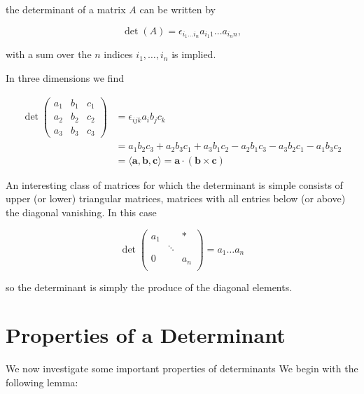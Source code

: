 \documentclass[a4paper,12pt]{report}
\begin{document}
the determinant of a matrix \(A\) can be written by

\begin{equation}
    \det(A) = \epsilon_{i_1 \ldots  i_n} a_{i_1 1} \ldots  a_{i_n n},
\end{equation}
    
with a sum over the \( n \) indices \( i_1, \ldots, i_n \) is implied.

In three dimensions we find 

\begin{equation}
    \begin{aligned}
        \det \begin{pmatrix} 
        a_1 & b_1 & c_1 \\ 
        a_2 & b_2 & c_2 \\ 
        a_3 & b_3 & c_3 
        \end{pmatrix} 
        &= \epsilon_{ijk} a_i b_j c_k \\ 
        &= a_1 b_2 c_3 + a_2 b_3 c_1 + a_3 b_1 c_2 - a_2 b_1 c_3 - a_3 b_2 c_1 - a_1 b_3 c_2 \\
        &= \langle \mathbf{a}, \mathbf{b}, \mathbf{c} \rangle = \mathbf{a} \cdot (\mathbf{b} \times \mathbf{c})
    \end{aligned}
\end{equation}

An interesting class of matrices for which the determinant is simple consists of upper (or lower) triangular matrices, \ie matrices with all entries below (or above) the diagonal vanishing. In this case

\begin{equation}
    \det \begin{pmatrix}
        a_1  &  & *  \\
         & \ddots  &   \\
        0 &  & a_{n}   \\
    \end{pmatrix} = a_1 \ldots a_{n} 
\end{equation}

so the determinant is simply the produce of the diagonal elements.

\section{Properties of a Determinant} \label{detprop} 

We now investigate some important properties of determinants We begin with the following lemma:
\end{document}
